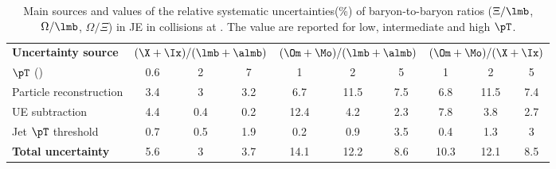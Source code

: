 \documentclass[ALICE,manyauthors]{cernphprep}
\begin{document}
\begin{table}[!ht]
	\begin{center}
		\caption{Main sources and values of the relative systematic uncertainties(\%) of baryon-to-baryon ratios ($\Xi/\lmb$, $\Omega/\lmb$, $\Omega/\Xi$) in JE in \pp collisions at \thirteen.
			The value are reported for low, intermediate and high $\pT$.}
		\label{tab:ppBBRatioUncer}
		\begin{tabularx}{\textwidth}{@{} lCCCCCCCCC @{}}
			\toprule
			\textbf{Uncertainty source} & 
			& 
			&  \\
			\cmidrule(lr){2-4} \cmidrule(lr){5-7} \cmidrule(lr){8-10}
			$\pT$ (\GeVc) & 0.6 & 2 &7  & 1 & 2 & 5 & 1 & 2 & 5 \\
			\midrule
			Particle reconstruction& 3.4& 3& 3.2& 6.7& 11.5& 7.5& 6.8& 11.5& 7.4\\
			UE subtraction& 4.4& 0.4& 0.2& 12.4& 4.2& 2.3& 7.8& 3.8& 2.7\\
			Jet $\pT$ threshold& 0.7& 0.5& 1.9& 0.2& 0.9& 3.5& 0.4& 1.3& 3\\
			\midrule
			\textbf{Total uncertainty}& 5.6& 3& 3.7& 14.1& 12.2& 8.6& 10.3& 12.1& 8.5\\
			\bottomrule
		\end{tabularx}
	\end{center}
\end{table}
\end{document}
